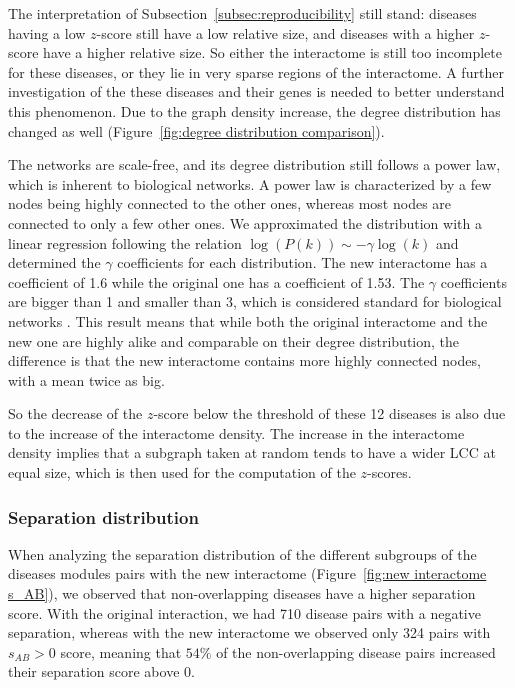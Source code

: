 \documentclass[letterpaper]{article}
\begin{document}
	The interpretation of Subsection~\ref{subsec:reproducibility} still stand: diseases having
	a low $z$-score still have a low relative size, and diseases with a higher $z$-score have a higher
	relative size. So either the interactome is still too incomplete for these diseases, or they lie in
	very sparse regions of the interactome. A further investigation of the these diseases and their genes
	is needed to better understand this phenomenon. Due to the graph density increase, the degree
	distribution has changed as well (Figure~\ref{fig:degree distribution comparison}).


	The networks are scale-free, and its degree distribution still follows a power law, which is inherent to
	biological networks. A power law is characterized by a few nodes being highly connected to the other ones,
	whereas most nodes are connected to only a few other ones. We approximated the distribution with a linear
	regression following the relation $\log(P(k)) \sim -\gamma\log(k)$ and determined the $\gamma$ coefficients
	for each distribution. The new interactome has a coefficient of 1.6 while the original one has a coefficient
	of 1.53. The $\gamma$ coefficients are bigger than 1 and smaller than 3, which is considered standard for
	biological networks \citep{UnderstandingTheCellFunctionalOrganization,vidal2011interactome}. This result
	means that while both the original interactome and the new one are highly alike and comparable on their
	degree distribution, the difference is that the new interactome contains more highly connected nodes,
	with a mean twice as big.

	So the decrease of the $z$-score below the threshold of these 12 diseases is also due to the increase of
	the interactome density. The increase in the interactome density implies that a subgraph taken at random
	tends to have a wider LCC at equal size, which is then used for the computation of the $z$-scores.

\subsubsection{Separation distribution}
	When analyzing the separation distribution of the different subgroups of the diseases modules pairs with
	the new interactome (Figure~\ref{fig:new interactome s_AB}), we observed that non-overlapping diseases have
	a higher separation score. With the original interaction, we had 710 disease pairs with a negative separation,
	whereas with the new interactome we observed only 324 pairs with $s_{AB} > 0$ score, meaning that
	$54\%$ of the non-overlapping disease pairs increased their separation score above 0.
\end{document}
